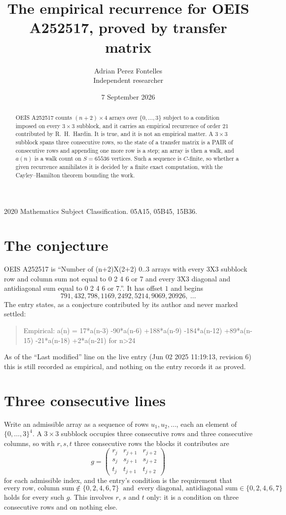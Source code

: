 \documentclass[11pt,a4paper]{article}
\title{The empirical recurrence for OEIS A252517, proved by transfer matrix}
\author{Adrian Perez Fontelles\\ \small Independent researcher}
\date{7 September 2026}
\theoremstyle{plain}
\theoremstyle{definition}
\begin{document}
\maketitle

\begin{abstract}
OEIS A252517 counts $(n+2)\times4$ arrays over $\{0,\dots,3\}$ subject to a condition imposed on
every $3\times3$ subblock, and it carries an empirical recurrence of order $21$
contributed by R.~H.~Hardin. It is true, and it is not an empirical matter. A $3\times3$
subblock spans three consecutive rows, so the state of a transfer matrix is a PAIR of
consecutive rows and appending one more row is a step; an array is then a walk, and
$a(n)$ is a walk count on $S=65536$ vertices. Such a sequence is $C$-finite, so whether a given
recurrence annihilates it is decided by a finite exact computation, with the Cayley--Hamilton
theorem bounding the work.
\end{abstract}

\noindent\small 2020 Mathematics Subject Classification. 05A15, 05B45, 15B36.\normalsize

\section{The conjecture}

OEIS A252517 is ``Number of (n+2)X(2+2) 0..3 arrays with every 3X3 subblock row and column sum not equal to 0 2 4 6 or 7 and every 3X3 diagonal and antidiagonal sum equal to 0 2 4 6 or 7.''. It has offset $1$ and begins
\[
791, 432, 798, 1169, 2492, 5214, 9069, 20926,\ \dots
\]
The entry states, as a conjecture contributed by its author and never marked settled:
\begin{quote}
Empirical: a(n) = 17*a(n-3) -90*a(n-6) +188*a(n-9) -184*a(n-12) +89*a(n-15) -21*a(n-18) +2*a(n-21) for n>24
\end{quote}
As of the ``Last modified'' line on the live entry (Jun 02 2025 11:19:13, revision 6) this is still
recorded as empirical, and nothing on the entry records it as proved.

\section{Three consecutive lines}

Write an admissible array as a sequence of rows $u_1,u_2,\dots$, each an element of
$\{0,\dots,3\}^{4}$. A $3\times3$ subblock occupies three consecutive rows and
three consecutive columns, so with $r,s,t$ three consecutive rows the blocks it
contributes are
\[
g=\begin{pmatrix}r_j&r_{j+1}&r_{j+2}\\ s_j&s_{j+1}&s_{j+2}\\ t_j&t_{j+1}&t_{j+2}\end{pmatrix}
\]
for each admissible index, and the entry's condition is the requirement that
\[
\text{every row, column sum} \notin \{0,2,4,6,7\}\ \text{ and }\ \text{every diagonal, antidiagonal sum} \in \{0,2,4,6,7\}
\]
holds for every such $g$. This involves $r$, $s$ and $t$ only: it is a condition on
three consecutive rows and on nothing else.
\end{document}
